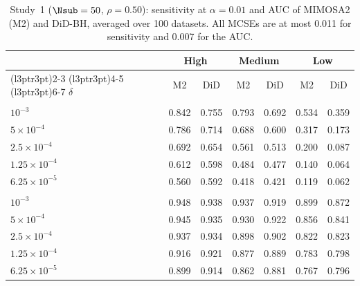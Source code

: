\begin{table}[!h]
\centering
\caption{\label{tab:base-main}Study~1 ($\Nsub = 50$, $\rho = 0.50$): sensitivity at $\alpha = 0.01$ and AUC of MIMOSA2 (M2) and DiD-BH, averaged over 100 datasets. All MCSEs are at most 0.011 for sensitivity and 0.007 for the AUC.}
\centering
\fontsize{10}{12}\selectfont
\begin{tabular}[t]{lcccccc}
\toprule
\multicolumn{1}{c}{ } & \multicolumn{2}{c}{High} & \multicolumn{2}{c}{Medium} & \multicolumn{2}{c}{Low} \\
\cmidrule(l{3pt}r{3pt}){2-3} \cmidrule(l{3pt}r{3pt}){4-5} \cmidrule(l{3pt}r{3pt}){6-7}
$\delta$ & M2 & DiD & M2 & DiD & M2 & DiD\\
\midrule
\addlinespace[0.3em]
\multicolumn{7}{l}{\textit{(a) Sensitivity}}\\
\hspace{1em}$10^{-3}$ & 0.842 & 0.755 & 0.793 & 0.692 & 0.534 & 0.359\\
\hspace{1em}$5\times10^{-4}$ & 0.786 & 0.714 & 0.688 & 0.600 & 0.317 & 0.173\\
\hspace{1em}$2.5\times10^{-4}$ & 0.692 & 0.654 & 0.561 & 0.513 & 0.200 & 0.087\\
\hspace{1em}$1.25\times10^{-4}$ & 0.612 & 0.598 & 0.484 & 0.477 & 0.140 & 0.064\\
\hspace{1em}$6.25\times10^{-5}$ & 0.560 & 0.592 & 0.418 & 0.421 & 0.119 & 0.062\\
\addlinespace[0.3em]
\multicolumn{7}{l}{\textit{(b) AUC}}\\
\hspace{1em}$10^{-3}$ & 0.948 & 0.938 & 0.937 & 0.919 & 0.899 & 0.872\\
\hspace{1em}$5\times10^{-4}$ & 0.945 & 0.935 & 0.930 & 0.922 & 0.856 & 0.841\\
\hspace{1em}$2.5\times10^{-4}$ & 0.937 & 0.934 & 0.898 & 0.902 & 0.822 & 0.823\\
\hspace{1em}$1.25\times10^{-4}$ & 0.916 & 0.921 & 0.877 & 0.889 & 0.783 & 0.798\\
\hspace{1em}$6.25\times10^{-5}$ & 0.899 & 0.914 & 0.862 & 0.881 & 0.767 & 0.796\\
\bottomrule
\end{tabular}
\end{table}
